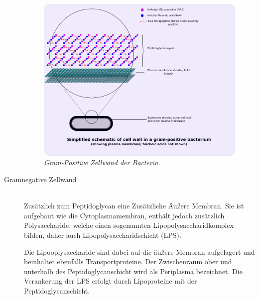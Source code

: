 \begin{description}
		\begin{figure}[ht!]
		\leavevmode
		\begin{center}
		\includegraphics[scale=0.27]{./pictures/gram_positive_zw}
		\end{center}
		\caption{\slshape{Gram-Positive Zellwand der Bacteria.}}
		\label{fig:gramPosBacZW}
		\end{figure}

	\item[Gramnegative Zellwand] \hfill \\
		Zusätzlich zum Peptidoglycan eine Zusätzliche Äußere Membran.
		Sie ist aufgebaut wie die Cytoplasmamembran,
		enthält jedoch zusätzlich Polysaccharide,
		welche einen sogenannten Lipopolysaccharidkomplex bilden,
		daher auch Lipopolysaccharidschicht (LPS).

		Die Lipooplysaccharide sind dabei auf die äußere Membran aufgelagert
		und beinhaltet ebenfalls Transportproteine.
		Der Zwischenraum ober und unterhalb des Peptidoglycanschicht 
		wird als Periplasma bezeichnet.
		Die Verankerung der LPS erfolgt durch Lipoproteine mit der Peptidoglycanschicht.
		

\end{description}

